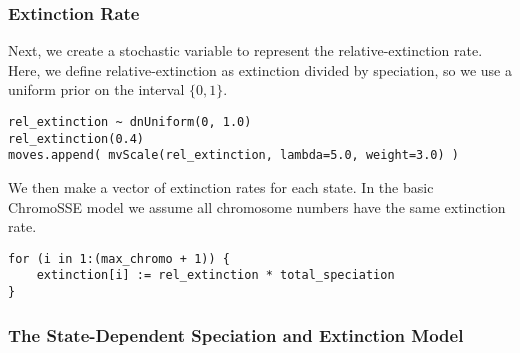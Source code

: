 \subsubsection{Extinction Rate}

Next, we create a stochastic variable to represent the relative-extinction rate.
Here, we define relative-extinction as extinction divided by speciation,
so we use a uniform prior on the interval $\{0,1\}$.
{\tt \begin{snugshade*}
\begin{lstlisting}
rel_extinction ~ dnUniform(0, 1.0)
rel_extinction(0.4)
moves.append( mvScale(rel_extinction, lambda=5.0, weight=3.0) )
\end{lstlisting}
\end{snugshade*}
}
We then make a vector of extinction rates for each state.
In the basic ChromoSSE model we assume all chromosome 
numbers have the same extinction rate.
{\tt \begin{snugshade*}
\begin{lstlisting}
for (i in 1:(max_chromo + 1)) {
    extinction[i] := rel_extinction * total_speciation
}
\end{lstlisting}
\end{snugshade*}
}

\subsubsection{The State-Dependent Speciation and Extinction Model}

